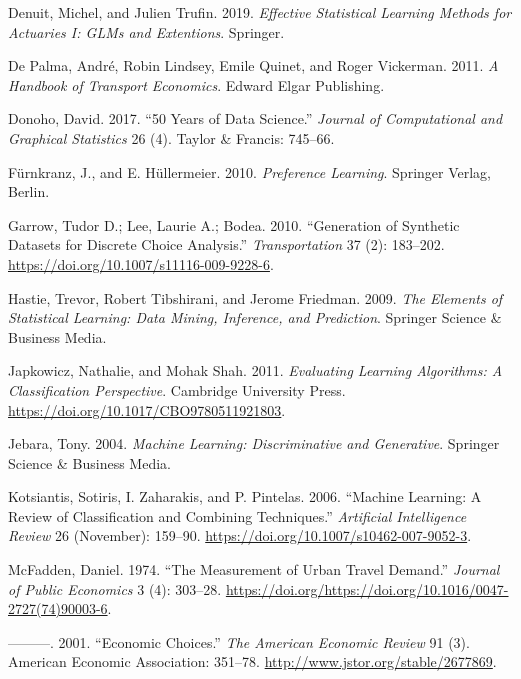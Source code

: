 \documentclass[11pt,]{article}
\begin{document}
\leavevmode\hypertarget{ref-denuit2019as1}{}%
Denuit, Michel, and Julien Trufin. 2019. \emph{Effective Statistical
Learning Methods for Actuaries I: GLMs and Extentions}. Springer.

\leavevmode\hypertarget{ref-depalma2011tr}{}%
De Palma, André, Robin Lindsey, Emile Quinet, and Roger Vickerman. 2011.
\emph{A Handbook of Transport Economics}. Edward Elgar Publishing.

\leavevmode\hypertarget{ref-donoho2017ds}{}%
Donoho, David. 2017. ``50 Years of Data Science.'' \emph{Journal of
Computational and Graphical Statistics} 26 (4). Taylor \& Francis:
745--66.

\leavevmode\hypertarget{ref-furnkranz2011p}{}%
Fürnkranz, J., and E. Hüllermeier. 2010. \emph{Preference Learning}.
Springer Verlag, Berlin.

\leavevmode\hypertarget{ref-garrow2010gs}{}%
Garrow, Tudor D.; Lee, Laurie A.; Bodea. 2010. ``Generation of Synthetic
Datasets for Discrete Choice Analysis.'' \emph{Transportation} 37 (2):
183--202. \url{https://doi.org/10.1007/s11116-009-9228-6}.

\leavevmode\hypertarget{ref-hastie2009sl}{}%
Hastie, Trevor, Robert Tibshirani, and Jerome Friedman. 2009. \emph{The
Elements of Statistical Learning: Data Mining, Inference, and
Prediction}. Springer Science \& Business Media.

\leavevmode\hypertarget{ref-japkowicz2011el}{}%
Japkowicz, Nathalie, and Mohak Shah. 2011. \emph{Evaluating Learning
Algorithms: A Classification Perspective}. Cambridge University Press.
\url{https://doi.org/10.1017/CBO9780511921803}.

\leavevmode\hypertarget{ref-jebara2004ml}{}%
Jebara, Tony. 2004. \emph{Machine Learning: Discriminative and
Generative}. Springer Science \& Business Media.

\leavevmode\hypertarget{ref-kotsiantis2006tr}{}%
Kotsiantis, Sotiris, I. Zaharakis, and P. Pintelas. 2006. ``Machine
Learning: A Review of Classification and Combining Techniques.''
\emph{Artificial Intelligence Review} 26 (November): 159--90.
\url{https://doi.org/10.1007/s10462-007-9052-3}.

\leavevmode\hypertarget{ref-mcfadden1974utd}{}%
McFadden, Daniel. 1974. ``The Measurement of Urban Travel Demand.''
\emph{Journal of Public Economics} 3 (4): 303--28.
\url{https://doi.org/https://doi.org/10.1016/0047-2727(74)90003-6}.

\leavevmode\hypertarget{ref-mcfadden2001ec}{}%
---------. 2001. ``Economic Choices.'' \emph{The American Economic
Review} 91 (3). American Economic Association: 351--78.
\url{http://www.jstor.org/stable/2677869}.
\end{document}
